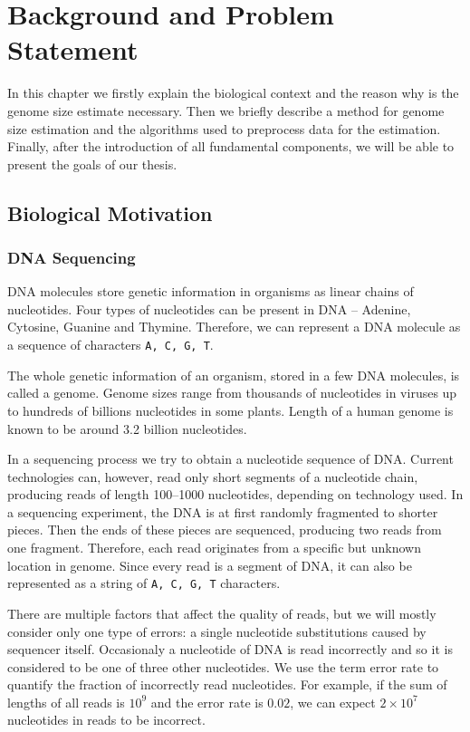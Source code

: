 \chapter{Background and Problem Statement}
In this chapter we firstly explain the biological context and the reason why is the genome size estimate necessary.
Then we briefly describe a method for genome size estimation and the algorithms used to preprocess data for the estimation.
Finally, after the introduction of all fundamental components, we will be able to present the goals of our thesis.

\section{Biological Motivation}

\subsection{DNA Sequencing}
\label{sec:sequencing}

DNA molecules store genetic information in organisms as linear chains of nucleotides.
Four types of nucleotides can be present in DNA -- Adenine, Cytosine, Guanine and Thymine.
Therefore, we can represent a DNA molecule as a sequence of characters \texttt{A, C, G, T}.

The whole genetic information of an organism, stored in a few DNA molecules, is called a genome.
Genome sizes range from thousands of nucleotides in viruses up to hundreds of billions nucleotides in some plants.
Length of a human genome is known to be around 3.2 billion nucleotides.

In a sequencing process we try to obtain a nucleotide sequence of DNA. Current technologies can, however, read only
short segments of a nucleotide chain, producing reads of length 100--1000 nucleotides, depending on technology used. 
In a sequencing experiment, the DNA is at first randomly fragmented to shorter pieces. Then the ends of these pieces
are sequenced, producing two reads from one fragment. Therefore, each read originates from a specific but unknown location in genome. 
Since every read is a segment of DNA, it can also be represented as a string of \texttt{A, C, G, T} characters.

There are multiple factors that affect the quality of reads, but we will mostly consider only one type of errors: 
a single nucleotide substitutions caused by sequencer itself. Occasionaly a nucleotide of DNA is
read incorrectly and so it is considered to be one of three other nucleotides. We use the term error rate to
quantify the fraction of incorrectly read nucleotides. For example, if the sum of lengths of all reads is $10^9$
and the error rate is $0.02$, we can expect $2 \times 10^7$ nucleotides in reads to be incorrect.

